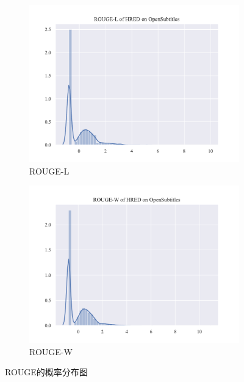 \begin{figure}
\begin{subfigure}{0.5\linewidth}
        \includegraphics[width=\linewidth]{figure/distplot/opensub/hred/rouge_l/plot.pdf}
        \caption{ROUGE-L}
    \end{subfigure}%
    \begin{subfigure}{0.5\linewidth}
        \centering
        \includegraphics[width=\linewidth]{figure/distplot/opensub/hred/rouge_w/plot.pdf}
        \caption{ROUGE-W}
    \end{subfigure}
    \centering
    \caption{ROUGE的概率分布图}
    \label{fig:ROUGE_dist}
\end{figure}

